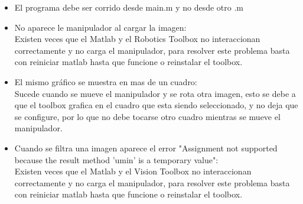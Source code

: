 \begin{itemize}
\item El programa debe ser corrido desde main.m y no desde otro .m
\item No aparece le manipulador al cargar la imagen:\\
Existen veces que el Matlab y el Robotics Toolbox no interaccionan correctamente y no carga el manipulador, para resolver este problema basta con reiniciar matlab hasta que funcione o reinstalar el toolbox.
\item El mismo gr\'afico se muestra en mas de un cuadro:\\
Sucede cuando se mueve el manipulador y se rota otra imagen, esto se debe a que el toolbox grafica en el cuadro que esta siendo seleccionado, y no deja que se configure, por lo que no debe tocarse otro cuadro mientras se mueve el manipulador.
\item Cuando se filtra una imagen aparece el error "Assignment not supported because the result method 'umin' is a temporary value":\\
Existen veces que el Matlab y el Vision Toolbox no interaccionan correctamente y no carga el manipulador, para resolver este problema basta con reiniciar matlab hasta que funcione o reinstalar el toolbox.
\end{itemize}
